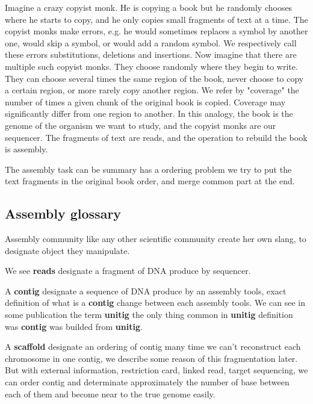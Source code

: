 \documentclass[./main.tex]{subfiles}
\begin{document}
Imagine a crazy copyist monk. He is copying a book but he randomly chooses where he starts to copy, and he only copies small fragments of text at a time.
The copyist monks make errors, e.g. he would sometimes replaces a symbol by another one, would skip a symbol, or would add a random symbol. We respectively call these errors substitutions, deletions and insertions.
Now imagine that there are multiple such copyist monks.
They choose randomly where they begin to write. They can choose several times the same region of the book, never choose to copy a certain region, or more rarely copy another region. We refer by "coverage" the number of times a given chunk of the original book is copied. Coverage may significantly differ from one region to another.
In this analogy, the book is the genome of the organism we want to study, and the copyist monks are our sequencer. The fragments of text are reads, and the operation to rebuild the book is assembly.

The assembly task can be summary has a ordering problem we try to put the text fragments in the original book order, and merge common part at the end.

\subsection{Assembly glossary} 

Assembly community like any other scientific community create her own slang, to designate object they manipulate.

We see \textbf{reads} designate a fragment of DNA produce by sequencer.

A \textbf{contig} designate a sequence of DNA produce by an assembly tools, exact definition of what is a \textbf{contig} change between each assembly tools. We can see in some publication the term \textbf{unitig} the only thing common in \textbf{unitig} definition was \textbf{contig} was builded from \textbf{unitig}.

A \textbf{scaffold} designate an ordering of contig many time we can't reconstruct each chromosome in one contig, we describe some reason of this fragmentation later. But with external information, restriction card, linked read, target sequencing, we can order contig and determinate approximately the number of base between each of them and become near to the true genome easily.
\end{document}
